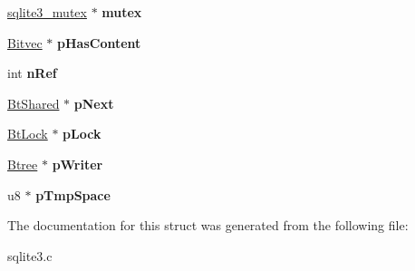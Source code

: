\begin{DoxyCompactItemize}
\item 
\hyperlink{structsqlite3__mutex}{sqlite3\+\_\+mutex} $\ast$ {\bfseries mutex}\hypertarget{structBtShared_a454c31d726220bbed43c165e370460c8}{}\label{structBtShared_a454c31d726220bbed43c165e370460c8}

\item 
\hyperlink{structBitvec}{Bitvec} $\ast$ {\bfseries p\+Has\+Content}\hypertarget{structBtShared_ace6191dc3f48f9575d7946ab8cf5b919}{}\label{structBtShared_ace6191dc3f48f9575d7946ab8cf5b919}

\item 
int {\bfseries n\+Ref}\hypertarget{structBtShared_a43d0226fa08d7fae5f992f3a2d72cc08}{}\label{structBtShared_a43d0226fa08d7fae5f992f3a2d72cc08}

\item 
\hyperlink{structBtShared}{Bt\+Shared} $\ast$ {\bfseries p\+Next}\hypertarget{structBtShared_aaa9dd5c5d4ec2bb79ebe4b37ee926ae3}{}\label{structBtShared_aaa9dd5c5d4ec2bb79ebe4b37ee926ae3}

\item 
\hyperlink{structBtLock}{Bt\+Lock} $\ast$ {\bfseries p\+Lock}\hypertarget{structBtShared_af58c79eec88f99ed5a07d8cabf8a1d1a}{}\label{structBtShared_af58c79eec88f99ed5a07d8cabf8a1d1a}

\item 
\hyperlink{structBtree}{Btree} $\ast$ {\bfseries p\+Writer}\hypertarget{structBtShared_ad8b2679e54027d58a3be3afcca4df1d6}{}\label{structBtShared_ad8b2679e54027d58a3be3afcca4df1d6}

\item 
u8 $\ast$ {\bfseries p\+Tmp\+Space}\hypertarget{structBtShared_a89102c20327da8a304f7e95af557bdf4}{}\label{structBtShared_a89102c20327da8a304f7e95af557bdf4}

\end{DoxyCompactItemize}


The documentation for this struct was generated from the following file\+:\begin{DoxyCompactItemize}
\item 
sqlite3.\+c\end{DoxyCompactItemize}
